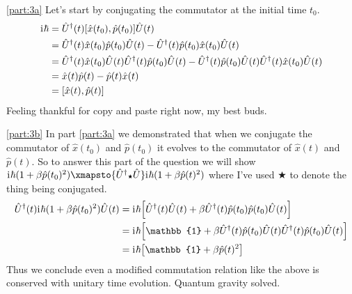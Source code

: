 \documentclass[boxes,pages]{homework}
\makeatletter
\newcommand{\iu}{\mathrm{i}\mkern1mu}
\newcommand{\herm}[1]{{{#1}^\dagger}}
\numberwithin{@problem}{section}
\makeatother
\begin{document}
\begin{solution}
	\ref{part:3a}
	Let's start by conjugating the commutator at the initial time $t_0$.
	\begin{align*}
		\iu\hbar & = \herm{\hat{U}}(t)\comm{\hat{x}(t_0)}{\hat{p}(t_0)}\hat{U}(t)                                                                                                    \\
		         & = \herm{\hat{U}}(t)\hat{x}(t_0)\hat{p}(t_0)\hat{U}(t) - \herm{\hat{U}}(t)\hat{p}(t_0)\hat{x}(t_0)\hat{U}(t)                                                       \\
		         & = \herm{\hat{U}}(t)\hat{x}(t_0)\hat{U}(t)\herm{\hat{U}}(t)\hat{p}(t_0)\hat{U}(t) - \herm{\hat{U}}(t)\hat{p}(t_0)\hat{U}(t)\herm{\hat{U}}(t)\hat{x}(t_0)\hat{U}(t) \\
		         & = \hat{x}(t)\hat{p}(t) - \hat{p}(t)\hat{x}(t)                                                                                                                     \\
		         & = \comm{\hat{x}(t)}{\hat{p}(t)}
	\end{align*}
	Feeling thankful for copy and paste right now, my best buds.

	\ref{part:3b}
	In part \ref{part:3a} we demonstrated that when we conjugate the commutator of $\hat{x}(t_0)$ and $\hat{p}(t_0)$ it evolves to the commutator of $\hat{x}(t)$ and $\hat{p}(t)$. So to answer this part of the question we will show $\iu\hbar(1 + \beta\hat{p}(t_0)^2)\xmapsto{\herm{\hat{U}}{\scriptscriptstyle \bigstar}\hat{U}} \iu\hbar(1 + \beta\hat{p}(t)^2)$ where I've used $\bigstar$ to denote the thing being conjugated.
	\begin{align*}
		\herm{\hat{U}}(t)\iu\hbar(1 + \beta\hat{p}(t_0)^2)\hat{U}(t) & = \iu\hbar\qty[\herm{\hat{U}}(t)\hat{U}(t) + \beta \herm{\hat{U}}(t)\hat{p}(t_0)\hat{p}(t_0)\hat{U}(t)]           \\
		                                                             & = \iu\hbar\qty[\mathbb{1} + \beta \herm{\hat{U}}(t)\hat{p}(t_0)\hat{U}(t)\herm{\hat{U}}(t)\hat{p}(t_0)\hat{U}(t)] \\
		                                                             & = \iu\hbar\qty[\mathbb{1} + \beta \hat{p}(t)^2]
	\end{align*}
	Thus we conclude even a modified commutation relation like the above is conserved with unitary time evolution. Quantum gravity solved.
\end{solution}
\end{document}
